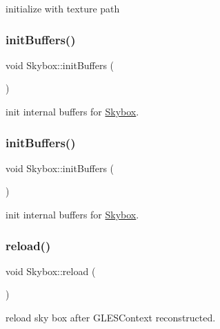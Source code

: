 initialize with texture path \mbox{\label{classSkybox_aaa891e053fd462be49be63ab24b5651e}} 
\subsubsection{\texorpdfstring{init\+Buffers()}{initBuffers()}\hspace{0.1cm}{\footnotesize\ttfamily [1/2]}}
{\footnotesize\ttfamily void Skybox\+::init\+Buffers (\begin{DoxyParamCaption}{ }\end{DoxyParamCaption})\hspace{0.3cm}{\ttfamily [protected]}}

init internal buffers for \hyperlink{classSkybox}{Skybox}. \mbox{\label{classSkybox_aaa891e053fd462be49be63ab24b5651e}} 
\subsubsection{\texorpdfstring{init\+Buffers()}{initBuffers()}\hspace{0.1cm}{\footnotesize\ttfamily [2/2]}}
{\footnotesize\ttfamily void Skybox\+::init\+Buffers (\begin{DoxyParamCaption}{ }\end{DoxyParamCaption})\hspace{0.3cm}{\ttfamily [protected]}}

init internal buffers for \hyperlink{classSkybox}{Skybox}. \mbox{\label{classSkybox_af09eb13578e196610693fd7fe4be6805}} 
\subsubsection{\texorpdfstring{reload()}{reload()}\hspace{0.1cm}{\footnotesize\ttfamily [1/2]}}
{\footnotesize\ttfamily void Skybox\+::reload (\begin{DoxyParamCaption}{ }\end{DoxyParamCaption})}

reload sky box after G\+L\+E\+S\+Context reconstructed. \mbox{\label{classSkybox_af09eb13578e196610693fd7fe4be6805}} 
